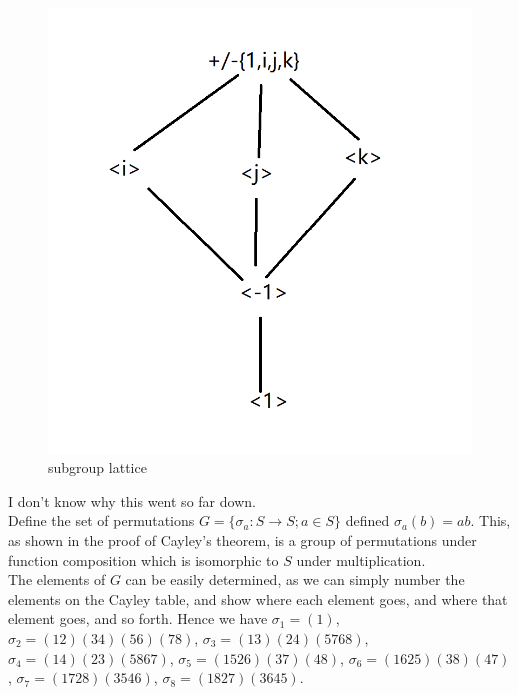 \documentclass{article}
\begin{document}
\begin{figure}[htbp]
\centerline{\includegraphics[scale=0.5]{quaternion_latice.png}}
\caption{subgroup lattice}
\label{fig}
\end{figure}
I don't know why this went so far down.\\

Define the set of permutations $G= \{\sigma_a:S\rightarrow S; a\in S\}$ defined $\sigma_a(b) = ab$. This, as shown in the proof of Cayley's theorem, is a group of permutations under function composition which is isomorphic to $S$ under multiplication.\\

The elements of $G$ can be easily determined, as we can simply number the elements on the Cayley table, and show where each element goes, and where that element goes, and so forth. Hence we have $\sigma_1 = (1)$, $\sigma_2 = (12)(34)(56)(78)$, $\sigma_3 = (13)(24)(5768)$, $\sigma_4 = (14)(23)(5867)$, $\sigma_5 = (1526)(37)(48)$, $\sigma_6 = (1625)(38)(47)$, $\sigma_7 = (1728)(3546)$, $\sigma_8 = (1827)(3645).$
\end{document}
